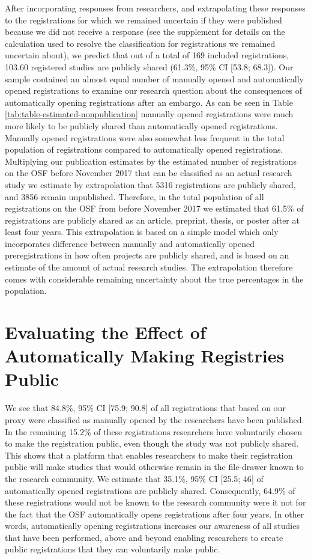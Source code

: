\documentclass[
  ,man, a4paper,floatsintext]{apa6}
\begin{document}
After incorporating responses from researchers, and extrapolating these responses to the registrations for which we remained uncertain if they were published because we did not receive a response (see the supplement for details on the calculation used to resolve the classification for registrations we remained uncertain about), we predict that out of a total of 169 included registrations, 103.60 registered studies are publicly shared (61.3\%, 95\% CI {[}53.8; 68.3{]}). Our sample contained an almost equal number of manually opened and automatically opened registrations to examine our research question about the consequences of automatically opening registrations after an embargo. As can be seen in Table \ref{tab:table-estimated-nonpublication} manually opened registrations were much more likely to be publicly shared than automatically opened registrations. Manually opened registrations were also somewhat less frequent in the total population of registrations compared to automatically opened registrations. Multiplying our publication estimates by the estimated number of registrations on the OSF before November 2017 that can be classified as an actual research study we estimate by extrapolation that 5316 registrations are publicly shared, and 3856 remain unpublished. Therefore, in the total population of all registrations on the OSF from before November 2017 we estimated that 61.5\% of registrations are publicly shared as an article, preprint, thesis, or poster after at least four years. This extrapolation is based on a simple model which only incorporates difference between manually and automatically opened preregistrations in how often projects are publicly shared, and is based on an estimate of the amount of actual research studies. The extrapolation therefore comes with considerable remaining uncertainty about the true percentages in the population.

\section{Evaluating the Effect of Automatically Making Registries Public}\label{evaluating-the-effect-of-automatically-making-registries-public}

We see that 84.8\%, 95\% CI {[}75.9; 90.8{]} of all registrations that based on our proxy were classified as manually opened by the researchers have been published. In the remaining 15.2\% of these registrations researchers have voluntarily chosen to make the registration public, even though the study was not publicly shared. This shows that a platform that enables researchers to make their registration public will make studies that would otherwise remain in the file-drawer known to the research community. We estimate that 35.1\%, 95\% CI {[}25.5; 46{]} of automatically opened registrations are publicly shared. Consequently, 64.9\% of these registrations would not be known to the research community were it not for the fact that the OSF automatically opens registrations after four years. In other words, automatically opening registrations increases our awareness of all studies that have been performed, above and beyond enabling researchers to create public registrations that they can voluntarily make public.
\end{document}
